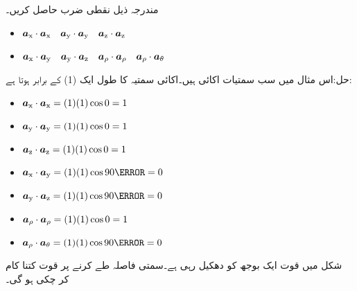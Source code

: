 مندرجہ ذیل نقطی ضرب حاصل کریں۔
\begin{itemize}
\item
$\ax \cdot \ax \quad \ay \cdot \ay \quad \az \cdot \az$
\item
$\ax \cdot \ay \quad \ay \cdot \az \quad \arho \cdot \arho \quad \arho \cdot \atheta$
\end{itemize}

حل:اس مثال میں سب سمتیات اکائی  ہیں۔اکائی سمتیہ کا طول ایک (1) کے برابر ہوتا ہے:
\begin{itemize}
\item
$\ax \cdot \ax =(1) (1) \cos 0=1$
\item
$\ay \cdot \ay =(1) (1) \cos 0=1$
\item
$\az \cdot \az =(1) (1) \cos 0=1$
\item
$\ax \cdot \ay =(1) (1) \cos 90\degree=0$
\item
$\ay \cdot \az =(1) (1) \cos 90\degree=0$
\item
$\arho \cdot \arho =(1) (1) \cos 0=1$
\item
$\arho \cdot \atheta =(1) (1) \cos 90\degree=0$
\end{itemize}
شکل   میں قوت  ایک بوجھ کو دھکیل رہی ہے۔سمتی فاصلہ   طے کرنے پر قوت کتنا کام کر چکی ہو گی۔

